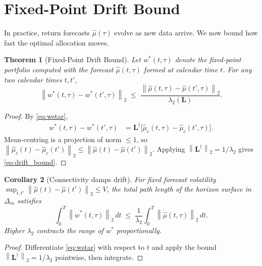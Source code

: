 \documentclass[twocolumn,11pt,a4paper]{article}
\theoremstyle{plain}
\newtheorem{theorem}{Theorem}[section]
\newtheorem{corollary}[theorem]{Corollary}
\theoremstyle{definition}
\theoremstyle{remark}
\newcommand{\Lop}{\mathbf{L}}        %
\newcommand{\Lpinv}{\mathbf{L}^{\dagger}} %
\newcommand{\wstar}{w^{*}}
\newcommand{\Deltam}{\Delta_m}
\newcommand{\lamtwo}{\lambda_2}
\newcommand{\norm}[1]{\left\|#1\right\|}
\begin{document}
\section{Fixed-Point Drift Bound}
\label{sec:drift}

In practice, return forecasts $\hat\mu(\tau)$ evolve as new data
arrive.  We now bound how fast the optimal allocation moves.

\begin{theorem}[Fixed-Point Drift Bound]
  \label{thm:drift}
  Let $\wstar(t,\tau)$ denote the fixed-point portfolio computed with
  the forecast $\hat\mu(t,\tau)$ formed at calendar time $t$.  For
  any two calendar times $t,t'$,
  \begin{equation}
    \norm{\wstar(t,\tau)-\wstar(t',\tau)}_2
    \;\le\; \frac{\norm{\hat\mu(t,\tau)-\hat\mu(t',\tau)}_2}{\lamtwo(\Lop)}.
    \label{eq:drift_bound}
  \end{equation}
\end{theorem}

\begin{proof}
  By \eqref{eq:wstar},
  \begin{align}
    \wstar(t,\tau)-\wstar(t',\tau)
    &= \Lpinv\!\bigl[\hat\mu_c(t,\tau)-\hat\mu_c(t',\tau)\bigr].
    \label{eq:drift_proof}
  \end{align}
  Mean-centring is a projection of norm $\le 1$, so
  $\norm{\hat\mu_c(t)-\hat\mu_c(t')}_2\le\norm{\hat\mu(t)-\hat\mu(t')}_2$.
  Applying $\norm{\Lpinv}_2=1/\lamtwo$ gives \eqref{eq:drift_bound}.
\end{proof}

\begin{corollary}[Connectivity damps drift]
  \label{cor:connectivity_damps}
  For fixed forecast volatility $\sup_{t,t'}\norm{\hat\mu(t)-\hat\mu(t')}_2\le V$,
  the total path length of the horizon surface in $\Deltam$ satisfies
  \begin{equation}
    \int_0^T\norm{\dot\wstar(t,\tau)}_2\,dt
    \;\le\; \frac{1}{\lamtwo}\int_0^T\norm{\dot{\hat\mu}(t,\tau)}_2\,dt.
    \label{eq:drift_path}
  \end{equation}
  Higher $\lamtwo$ contracts the range of $\wstar$ proportionally.
\end{corollary}

\begin{proof}
  Differentiate \eqref{eq:wstar} with respect to $t$ and apply the
  bound $\norm{\Lpinv}_2=1/\lamtwo$ pointwise, then integrate.
\end{proof}
\end{document}
